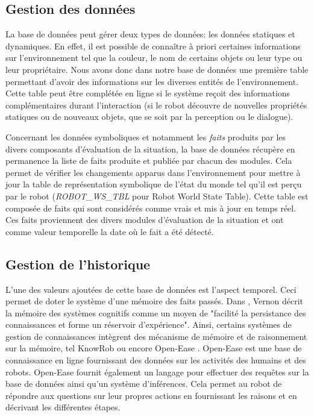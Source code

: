 \documentclass[a4paper,11pt,twoside]{StyleThese}
\begin{document}
\subsection{Gestion des données}
\label{sec:dbd}
La base de données peut gérer deux types de données: les données statiques et dynamiques. En effet, il est possible de connaître à priori certaines informations sur l'environnement tel que la couleur, le nom de certains objets ou leur type ou leur propriétaire. 
Nous avons donc dans notre base de données une première table permettant d'avoir des informations sur les diverses entités de l'environnement. Cette table peut être complétée en ligne si le système reçoit des informations complémentaires durant l'interaction (si le robot découvre de nouvelles propriétés statiques ou de nouveaux objets, que se soit par la perception ou le dialogue).

Concernant les données symboliques et notamment les \textit{faits} produits par les divers composants d'évaluation de la situation, la base de données récupère en permanence la liste de faits produite et publiée par chacun des modules. Cela permet de vérifier les changements apparus dans l'environnement pour mettre à jour la table de représentation symbolique de l'état du monde tel qu'il est perçu par le robot (\textit{ROBOT\_WS\_TBL} pour Robot World State Table).
Cette table est composée de faits qui sont considérés comme vrais et mis à jour en temps réel. Ces faits proviennent des divers modules d'évaluation de la situation et ont comme valeur temporelle la date où le fait a été détecté.


\subsection{Gestion de l'historique}
\label{sec:dbt}
L'une des valeurs ajoutées de cette base de données est l'aspect temporel.
Ceci permet de doter le système d'une mémoire des faits passés.
Dans \cite{vernon2014artificial}, Vernon décrit la mémoire des systèmes cognitifs comme un moyen de "facilité la persistance des connaissances et forme un réservoir d'expérience".
Ainsi, certains systèmes de gestion de connaissances intègrent des mécanisme de mémoire et de raisonnement sur la mémoire, tel KnowRob \cite{tenorth2015representations} ou encore Open-Ease \cite{beetz2015open}.
Open-Ease est une base de connaissance en ligne fournissant des données sur les activités des humains et des robots. Open-Ease fournit également un langage pour effectuer des requêtes sur la base de données ainsi qu'un système d'inférences. Cela permet au robot de répondre aux questions sur leur propres actions en fournissant les raisons et en décrivant les différentes étapes.
\end{document}
